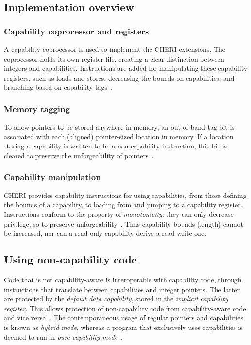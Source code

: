 \documentclass[dissertation.tex]{subfiles}
\begin{document}
\subsection{Implementation overview}

\subsubsection{Capability coprocessor and registers}
A capability coprocessor is used to implement the CHERI extensions.
The coprocessor holds its own register file, creating a clear
distinction between integers and capabilities.
Instructions are added for manipulating these capability registers, such
as loads and stores, decreasing the bounds on capabilities, and
branching based on capability tags~\cite{cheri-risc-2014}.

\subsubsection{Memory tagging}
To allow pointers to be stored anywhere in memory, an out-of-band tag
bit is associated with each (aligned) pointer-sized location in memory.
If a location storing a capability is written to be a non-capability
instruction, this bit is cleared to preserve the unforgeability of
pointers~\cite{cheri-risc-2014}.

\subsubsection{Capability manipulation}
CHERI provides capability instructions for using capabilities, from
those defining the bounds of a capability, to loading from and jumping
to a capability register.
Instructions conform to the property of \emph{monotonicity}: they can
only decrease privilege, so to preserve
unforgeability~\cite{cheri-risc-2014}.
Thus capability bounds (length) cannot be increased, nor can a read-only
capability derive a read-write one.


\subsection{Using non-capability code}
Code that is not capability-aware is interoperable with capability code,
through instructions that translate between capabilities and integer
pointers.
The latter are protected by the \emph{default data capability}, stored
in the \emph{implicit capability register}.
This allows protection of non-capability code from capability-aware code
and vice versa~\cite{cheri-risc-2014}.
The contemporaneous usage of regular pointers and capabilities is known
as \emph{hybrid mode}, whereas a program that exclusively uses
capabilities is deemed to run in \emph{pure capability
mode}~\cite{cheri-prog-guide}.
\end{document}

